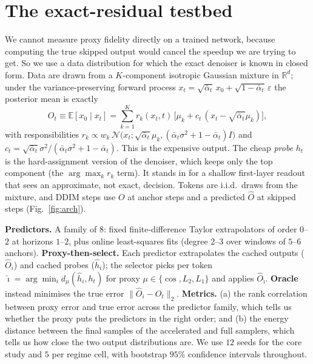 \documentclass[10pt,twocolumn]{article}
\begin{document}
\section{The exact-residual testbed}\label{sec:testbed}
We cannot measure proxy fidelity directly on a trained network, because computing the true
skipped output would cancel the speedup we are trying to get. So we use a data distribution
for which the exact denoiser is known in closed form. Data are drawn from a $K$-component
isotropic Gaussian
mixture in $\mathbb R^d$; under the variance-preserving forward process $x_t=\sqrt{\bar
\alpha_t}\,x_0+\sqrt{1-\bar\alpha_t}\,\varepsilon$ the posterior mean is exactly
\begin{equation}
O_t \equiv \mathbb E[x_0\mid x_t]=\sum_{k=1}^{K} r_k(x_t,t)\,\big[\mu_k+c_t\,(x_t-\sqrt{\bar\alpha_t}\mu_k)\big],
\end{equation}
with responsibilities $r_k\!\propto\! w_k\,\mathcal N\!\big(x_t;\sqrt{\bar\alpha_t}\mu_k,(\bar\alpha_t\sigma^2{+}1{-}\bar\alpha_t)I\big)$
and $c_t=\sqrt{\bar\alpha_t}\sigma^2/(\bar\alpha_t\sigma^2{+}1{-}\bar\alpha_t)$. This is the
expensive output. The cheap \emph{probe} $h_t$ is the hard-assignment version of the
denoiser, which keeps only the top component (the $\arg\max_k r_k$ term). It stands in for a
shallow first-layer readout that sees an approximate, not exact, decision. Tokens are
i.i.d.\ draws from the mixture, and DDIM steps use $O$ at anchor steps and a predicted
$\hat O$ at skipped steps (Fig.~\ref{fig:arch}).

\textbf{Predictors.} A family of $8$: fixed finite-difference Taylor extrapolators of order
$0$--$2$ at horizons $1$--$2$, plus online least-squares fits (degree $2$--$3$ over windows
of $5$--$6$ anchors). \textbf{Proxy-then-select.} Each predictor extrapolates the cached
outputs ($\hat O_i$) and cached probes ($\hat h_i$); the selector picks per token
$\hat\imath=\arg\min_i d_\mu(\hat h_i,h_t)$ for proxy $\mu\in\{\cos,L_2,L_1\}$ and applies
$\hat O_{\hat\imath}$. \textbf{Oracle} instead minimises the true error $\|\hat
O_i-O_t\|_2$. \textbf{Metrics.} (a) the rank correlation between proxy error and true error
across the predictor family, which tells us whether the proxy puts the predictors in the
right order; and (b) the energy distance\cite{szekely2013energy} between the final samples
of the accelerated and full samplers, which tells us how close the two output distributions
are. We use $12$ seeds for the core study and $5$ per regime cell, with bootstrap $95\%$
confidence intervals throughout.
\end{document}
